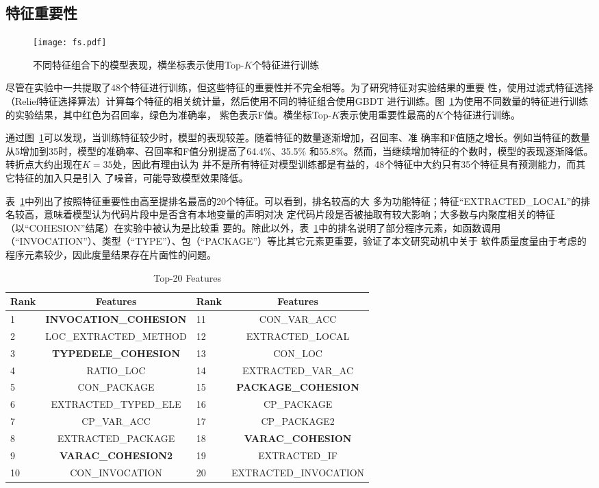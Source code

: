 \subsection{特征重要性}
  \begin{figure}
  \centering
  \texttt{[image: fs.pdf]}
    \caption{不同特征组合下的模型表现，横坐标表示使用Top-$K$个特征进行训练}
    \label{features}
  \end{figure}
尽管在实验中一共提取了48个特征进行训练，但这些特征的重要性并不完全相等。为了研究特征对实验结果的重要
性，使用过滤式特征选择（Relief特征选择算法）计算每个特征的相关统计量，然后使用不同的特征组合使用GBDT
进行训练。图~\ref{features}为使用不同数量的特征进行训练的实验结果，其中红色为召回率，绿色为准确率，
紫色表示F值。横坐标Top-$K$表示使用重要性最高的$K$个特征进行训练。

通过图~\ref{features}可以发现，当训练特征较少时，模型的表现较差。随着特征的数量逐渐增加，召回率、准
确率和F值随之增长。例如当特征的数量从5增加到35时，模型的准确率、召回率和F值分别提高了64.4\%、35.5\%
和55.8\%。然而，当继续增加特征的个数时，模型的表现逐渐降低。转折点大约出现在$K=35$处，因此有理由认为
并不是所有特征对模型训练都是有益的，48个特征中大约只有35个特征具有预测能力，而其它特征的加入只是引入
了噪音，可能导致模型效果降低。

表~\ref{important_features}中列出了按照特征重要性由高至提排名最高的20个特征。可以看到，排名较高的大
多为功能特征；特征``EXTRACTED\_LOCAL''的排名较高，意味着模型认为代码片段中是否含有本地变量的声明对决
定代码片段是否被抽取有较大影响；大多数与内聚度相关的特征（以``COHESION''结尾）在实验中被认为是比较重
要的。除此以外，表~\ref{important_features}中的排名说明了部分程序元素，如函数调用
（``INVOCATION''）、类型（``TYPE''）、包（``PACKAGE''）等比其它元素更重要，验证了本文研究动机中关于
软件质量度量由于考虑的程序元素较少，因此度量结果存在片面性的问题。

\begin{table}[!t]
  \scriptsize
  \renewcommand{\arraystretch}{1.3}
  \caption{Top-20 Features}
  \label{important_features}
  \centering
  \begin{tabular}{p{0.05cm}cp{0.05cm}c}
  \toprule Rank &Features &Rank &Features \\ \midrule
  1& \textbf{INVOCATION\_COHESION}& 11& CON\_VAR\_ACC\\
  2& LOC\_EXTRACTED\_METHOD& 12& EXTRACTED\_LOCAL\\
  3& \textbf{TYPEDELE\_COHESION}& 13& CON\_LOC\\
  4& RATIO\_LOC& 14& EXTRACTED\_VAR\_AC\\
  5& CON\_PACKAGE& 15& \textbf{PACKAGE\_COHESION}\\
  6& EXTRACTED\_TYPED\_ELE& 16& CP\_PACKAGE\\
  7& CP\_VAR\_ACC& 17& CP\_PACKAGE2\\
  8& EXTRACTED\_PACKAGE& 18& \textbf{VARAC\_COHESION}\\
  9& \textbf{VARAC\_COHESION2}& 19& EXTRACTED\_IF\\
  10& CON\_INVOCATION& 20& EXTRACTED\_INVOCATION\\
  \bottomrule 
  \end{tabular}
  \end{table}
  
